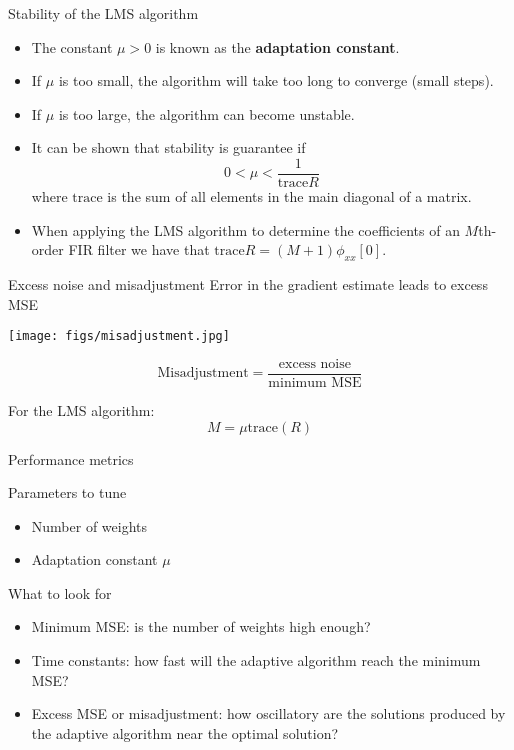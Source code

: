 \documentclass[10pt, aspectratio=169]{beamer}
\begin{document}
%
\begin{frame}{Stability of the LMS algorithm}

\begin{itemize}
	\item The constant $\mu > 0$ is known as the \textbf{adaptation constant}.
	\item If $\mu$ is too small, the algorithm will take too long to converge (small steps).
	\item If $\mu$ is too large, the algorithm can become unstable. 
	\item It can be shown that stability is guarantee if
	\begin{equation}
	0 < \mu < \frac{1}{\mathrm{trace} R} \tag{stability condition} 
	\end{equation}
	where $\mathrm{trace}$ is the sum of all elements in the main diagonal of a matrix.
	\item When applying the LMS algorithm to determine the coefficients of an $M$th-order FIR filter we have that $\mathrm{trace} R = (M+1)\phi_{xx}[0]$. 
\end{itemize}
\end{frame}

\begin{frame}{Excess noise and misadjustment}
	Error in the gradient estimate leads to excess MSE
	\begin{center}
		\texttt{[image: figs/misadjustment.jpg]}	
	\end{center}
	\begin{equation}
		\text{Misadjustment} = \frac{\text{excess noise}}{\text{minimum MSE}}\tag{definition}
	\end{equation}
	
	For the LMS algorithm:
	\begin{equation*}
		M = \mu\mathrm{trace}(R)
	\end{equation*}	
\end{frame}

\begin{frame}{Performance metrics}
	
	\begin{block}{Parameters to tune}
		\begin{itemize}
			\item Number of weights
			\item Adaptation constant $\mu$
		\end{itemize}
	\end{block}

	\begin{block}{What to look for}
		\begin{itemize}
			\item Minimum MSE: is the number of weights high enough?
			\item Time constants: how fast will the adaptive algorithm reach the minimum MSE?
			\item Excess MSE or misadjustment: how oscillatory are the solutions produced by the adaptive algorithm near the optimal solution?
		\end{itemize}
	\end{block}
\end{frame}
\end{document}
